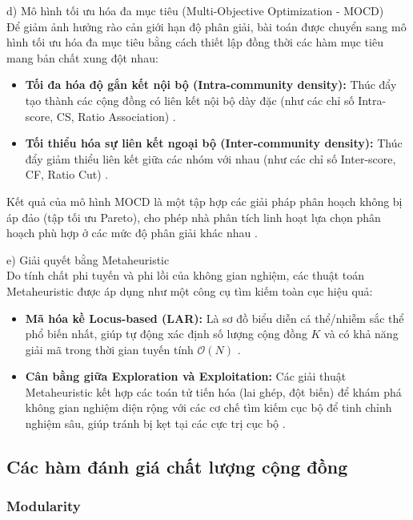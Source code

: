 \documentclass[14pt,a4paper]{extarticle}
\begin{document}
\noindent d) Mô hình tối ưu hóa đa mục tiêu (Multi-Objective Optimization - MOCD)
\\
Để giảm ảnh hưởng rào cản giới hạn độ phân giải, bài toán được chuyển sang mô hình tối ưu hóa đa mục tiêu bằng cách thiết lập đồng thời các hàm mục tiêu mang bản chất xung đột nhau:
\begin{itemize}
    \item \textbf{Tối đa hóa độ gắn kết nội bộ (Intra-community density):} Thúc đẩy tạo thành các cộng đồng có liên kết nội bộ dày đặc (như các chỉ số Intra-score, CS, Ratio Association) \cite{Baraa2021}.
    \item \textbf{Tối thiểu hóa sự liên kết ngoại bộ (Inter-community density):} Thúc đẩy giảm thiểu liên kết giữa các nhóm với nhau (như các chỉ số Inter-score, CF, Ratio Cut) \cite{Baraa2021}.
\end{itemize}
Kết quả của mô hình MOCD là một tập hợp các giải pháp phân hoạch không bị áp đảo (tập tối ưu Pareto), cho phép nhà phân tích linh hoạt lựa chọn phân hoạch phù hợp ở các mức độ phân giải khác nhau \cite{Gong2016}.

\noindent e) Giải quyết bằng Metaheuristic
\\
Do tính chất phi tuyến và phi lồi của không gian nghiệm, các thuật toán Metaheuristic được áp dụng như một công cụ tìm kiếm toàn cục hiệu quả:
\begin{itemize}
    \item \textbf{Mã hóa kề Locus-based (LAR):} Là sơ đồ biểu diễn cá thể/nhiễm sắc thể phổ biến nhất, giúp tự động xác định số lượng cộng đồng $K$ và có khả năng giải mã trong thời gian tuyến tính $\mathcal{O}(N)$ \cite{Pizzuti2008, Baraa2021, Pourabbasi2022, Beldi2025}.
    \item \textbf{Cân bằng giữa Exploration và Exploitation:} Các giải thuật Metaheuristic kết hợp các toán tử tiến hóa (lai ghép, đột biến) để khám phá không gian nghiệm diện rộng với các cơ chế tìm kiếm cục bộ để tinh chỉnh nghiệm sâu, giúp tránh bị kẹt tại các cực trị cục bộ \cite{Baraa2021}.
\end{itemize}

\subsection{Các hàm đánh giá chất lượng cộng đồng}

\subsubsection{Modularity}
\end{document}

